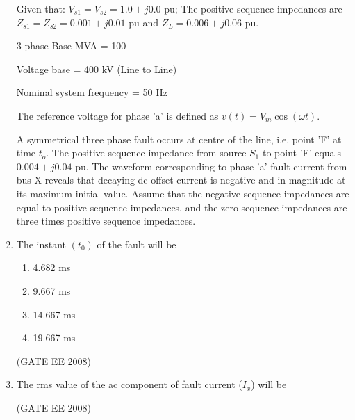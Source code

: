 \documentclass[journal,12pt,onecolumn]{IEEEtran}
\theoremstyle{remark}
\begin{document}
\begin{enumerate}[start=1, label=Q.\arabic*]
Given that:
$V_{s1} = V_{s2} = 1.0+j0.0$ pu;
The positive sequence impedances are $Z_{s1} = Z_{s2} = 0.001+j0.01$ pu and $Z_L = 0.006+j0.06$ pu.

3-phase Base MVA = 100

Voltage base = 400 kV (Line to Line)

Nominal system frequency = 50 Hz

The reference voltage for phase 'a' is defined as $v(t) = V_m \cos(\omega t)$.

A symmetrical three phase fault occurs at centre of the line, i.e. point 'F' at time $t_o$. The positive sequence impedance from source $S_1$ to point 'F' equals $0.004+j0.04$ pu. The waveform corresponding to phase 'a' fault current from bus X reveals that decaying dc offset current is negative and in magnitude at its maximum initial value. Assume that the negative sequence impedances are equal to positive sequence impedances, and the zero sequence impedances are three times positive sequence impedances. \\[10mm]


\item The instant $(t_0)$ of the fault will be

\begin{multicols}{2}
\begin{enumerate}[label=(\Alph*)]
    \item 4.682 ms
    \item 9.667 ms
    \item 14.667 ms
    \item 19.667 ms
\end{enumerate}
\end{multicols}
\hfill (GATE EE 2008) \\[5mm]

\item  The rms value of the ac component of fault current ($I_x$) will be
\begin{enumerate}[label=(\Alph*)]
\end{enumerate}
\hfill (GATE EE 2008) \\[5mm]


\end{enumerate}
\end{document}

